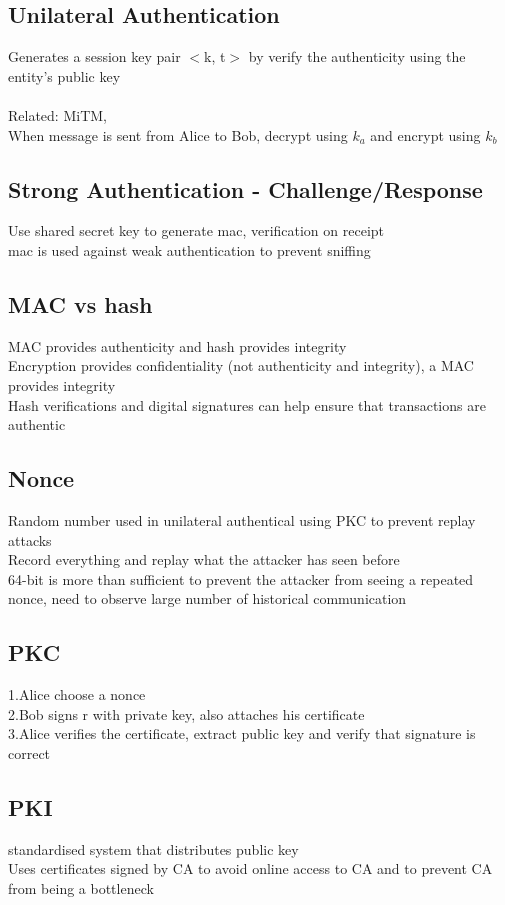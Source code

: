 \documentclass[11pt]{article}
\begin{document}
\begin{multicols*}{3}
\subsection*{Unilateral Authentication}
Generates a session key pair $<$k, t$>$ by verify the authenticity using the entity's public key\\\\
Related: MiTM,\\
When message is sent from Alice to Bob, decrypt using $k_{a}$ and encrypt using $k_{b}$\\
\subsection*{Strong Authentication - Challenge/Response}
Use shared secret key to generate mac, verification on receipt\\
mac is used against weak authentication to prevent sniffing
\subsection*{MAC vs hash}
MAC provides authenticity and hash provides integrity\\
Encryption provides confidentiality (not authenticity and integrity), a MAC provides integrity\\
Hash verifications and digital signatures can help ensure that transactions are authentic
\subsection*{Nonce}
Random number used in unilateral authentical using PKC to prevent replay attacks\\
Record everything and replay what the attacker has seen before\\
64-bit is more than sufficient to prevent the attacker from seeing a repeated nonce, need to observe large number of historical communication\\
\subsection*{PKC}
1.Alice choose a nonce\\
2.Bob signs r with private key, also attaches his certificate\\
3.Alice verifies the certificate, extract public key and verify that signature is correct
\subsection*{PKI}
standardised system that distributes public key\\
Uses certificates signed by CA to avoid online access to CA and to prevent CA from being a bottleneck\\

\end{multicols*}
\end{document}
